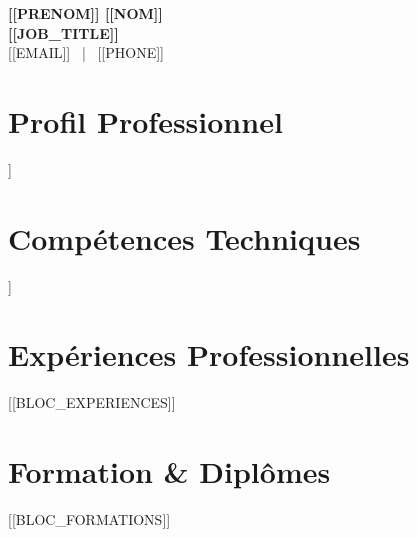 \documentclass[11pt,a4paper]{article}
\begin{document}
\pagestyle{empty}

\begin{center}
    {\Huge \textbf{[[PRENOM]] [[NOM]]}} \\[0.2cm]
    {\Large \textbf{[[JOB_TITLE]]}} \\[0.1cm]
    [[EMAIL]] \ | \ [[PHONE]]
\end{center}

\vspace{0.3cm}

\section*{Profil Professionnel}
\noindent
[[RESUME]]

\vspace{0.3cm}

\section*{Compétences Techniques}
\noindent
[[BLOC_COMPETENCES]]

\vspace{0.3cm}

\section*{Expériences Professionnelles}
[[BLOC_EXPERIENCES]]

\vspace{0.3cm}

\section*{Formation \& Diplômes}
[[BLOC_FORMATIONS]]
\end{document}

